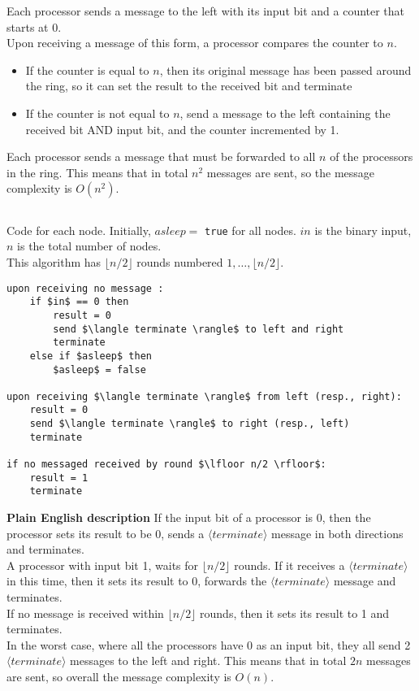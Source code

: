 \documentclass[11pt]{article}
\begin{document}
Each processor sends a message to the left with its input bit and a counter that starts at 0.\\
Upon receiving a message of this form, a processor compares the counter to $n$.\\
\begin{itemize}
\item If the counter is equal to $n$, then its original message has been passed around the ring, so it can set the result to the received bit and terminate
\item If the counter is not equal to $n$, send a message to the left containing the received bit AND input bit, and the counter incremented by 1.
\end{itemize}
Each processor sends a message that must be forwarded to all $n$ of the processors in the ring. This means that in total $n^2$ messages are sent, so the message complexity is $O(n^2)$.


\subsection{}

Code for each node. Initially, $asleep =$ \texttt{true} for all nodes. $in$ is the binary input, $n$ is the total number of nodes.\\
This algorithm has $\lfloor n/2 \rfloor$ rounds numbered $1,\dots,\lfloor n/2 \rfloor$.

\begin{lstlisting}
upon receiving no message :
	if $in$ == 0 then
		result = 0
		send $\langle terminate \rangle$ to left and right
		terminate
	else if $asleep$ then
		$asleep$ = false

upon receiving $\langle terminate \rangle$ from left (resp., right):
	result = 0
	send $\langle terminate \rangle$ to right (resp., left)
	terminate
	
if no messaged received by round $\lfloor n/2 \rfloor$:
	result = 1
	terminate

\end{lstlisting}

\textbf{Plain English description}
If the input bit of a processor is 0, then the processor sets its result to be 0, sends a $\langle terminate \rangle$ message in both directions and terminates.\\
A processor with input bit 1, waits for  $\lfloor n/2 \rfloor$ rounds. If it receives a $\langle terminate \rangle$ in this time, then it sets its result to 0, forwards the $\langle terminate \rangle$ message and terminates.\\
If no message is received within $\lfloor n/2 \rfloor$ rounds, then it sets its result to 1 and terminates.\\

In the worst case, where all the processors have 0 as an input bit, they all send 2 $\langle terminate \rangle$ messages to the left and right. This means that in total $2n$ messages are sent, so overall the message complexity is $O(n)$.
\end{document}
